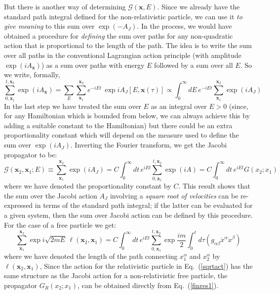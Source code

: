 \documentclass{article}
\def\eq#1{{Eq.~(\ref{#1})}}
\begin{document}
 But there is another way of determining $\mathcal{G}(\bm{x},E)$. Since we already have the standard  path integral defined for the  non-relativistic particle, we can use it \textit{to give meaning} to this sum over $\exp(-A_J)$. In the process, we would have obtained a procedure for \textit{defining} the sum over paths for any non-quadratic action that is proportional to the length of  the path. 
The idea is to write the sum over  all paths in the conventional Lagrangian action principle (with amplitude $\exp(iA_{\bm{x}})$) as a sum over paths with energy $E$ followed by a sum over all $E$. So we write, formally, 
\begin{equation}
 \sum_{0,\bm{x}_1}^{t,\bm{x}_2} \exp(iA_{\bm{x}}) = \sum_E \sum_{\bm{x}_1}^{\bm{x}_2} e^{-iEt} \, \exp iA_J[E,\bm{x}(\tau)] \propto \int_0^\infty dE\, e^{-iEt} \sum_{\bm{x}_1}^{\bm{x}_2} \exp(iA_J)
\end{equation} 
In the last step we have treated the sum over $E$ as an integral over $E>0$ (since, for any Hamiltonian which is bounded from below, we can always achieve this by adding a suitable constant to the Hamiltonian) but there could be an extra proportionality constant which will depend on the measure used to define the sum over $\exp(iA_J)$. Inverting the Fourier transform, we get the Jacobi propagator to be: 
\begin{equation}
\mathcal{G}(\bm{x}_2,\bm{x}_1;E) \equiv \sum_{\bm{x}_1}^{\bm{x}_2} \exp(iA_J) = C \int_0^\infty dt \, e^{iEt} \sum_{0,\bm{x}_1}^{t,\bm{x}_2} \exp(iA)
= C \int_0^\infty dt \, e^{iEt} G(x_2;x_1)
\label{pofe}
\end{equation} 
where we have denoted the proportionality constant by $C$. 
 This result shows that the sum over the  Jacobi action $A_J$ involving a \textit{square root of velocities} can be re-expressed in terms of the standard path integral; if the latter can be evaluated for a given system, then the sum over Jacobi action can be defined by this procedure.
 For the case of a free particle we get:
 \begin{equation}
 \sum_{\bm{x}_1}^{\bm{x}_2} \exp i\sqrt{2mE}\, \ell(\bm{x}_2,\bm{x}_1) = C \int_0^\infty dt \, e^{iEt}\sum_{0,\bm{x}_1}^{t,\bm{x}_2}\exp\frac{im}{2} \int_0^t d\tau \left( g_{\alpha\beta} \dot x^\alpha\dot  x^\beta\right)
\label{finres1}
\end{equation} 
where we have denoted the length of the path connecting $x^\alpha_1$ and  $x^\alpha_2$ by $\ell(\bm{x}_2,\bm{x}_1)$, 
Since the action for the relativistic particle in \eq{sqrtact}  has the same structure as the Jacobi action for a non-relativistic free particle, the propagator   $G_R(x_2;x_1)$, can be obtained directly from \eq{finres1}.
\end{document}

